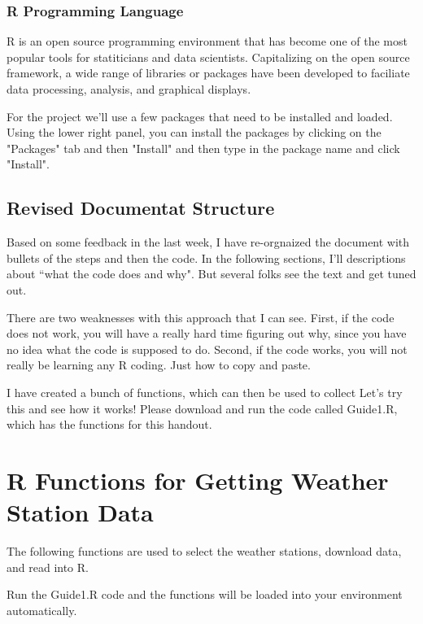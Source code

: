 \documentclass{article}\usepackage[]{graphicx}\usepackage[]{xcolor}
\begin{document}
\subsubsection{R Programming Language}

R is an open source programming environment that has become one of the most popular tools for statiticians and data scientists. Capitalizing on the open source framework, a wide range of libraries or packages have been developed to faciliate data processing, analysis, and graphical displays. 

For the project we'll use a few packages that need to be installed and loaded. Using the lower right panel, you can install the packages by clicking on the "Packages" tab and then "Install" and then type in the package name and click "Install".

\subsection{Revised Documentat Structure}

Based on some feedback in the last week, I have re-orgnaized the document with bullets of the steps and then the code. In the following sections, I'll descriptions about ``what the code does and why". But several folks see the text and get tuned out.

There are two weaknesses with this approach that I can see. First, if the code does not work, you will have a really hard time figuring out why, since you have no idea what the code is supposed to do. Second, if the code works, you will not really be learning any R coding. Just how to copy and paste.

I have created a bunch of functions, which can then be used to collect Let's try this and see how it works! Please download and run the code called Guide1.R, which has the functions for this handout.



\section{R Functions for Getting Weather Station Data}

The following functions are used to select the weather stations, download data, and read into R.

Run the Guide1.R code and the functions will be loaded into your environment automatically.
\end{document}
